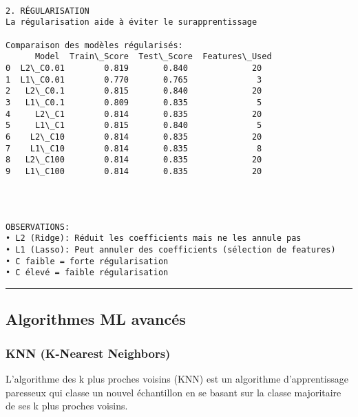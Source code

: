 \documentclass[11pt]{article}
\begin{document}
    \begin{Verbatim}[commandchars=\\\{\}]

2. RÉGULARISATION
La régularisation aide à éviter le surapprentissage

Comparaison des modèles régularisés:
      Model  Train\_Score  Test\_Score  Features\_Used
0  L2\_C0.01        0.819       0.840             20
1  L1\_C0.01        0.770       0.765              3
2   L2\_C0.1        0.815       0.840             20
3   L1\_C0.1        0.809       0.835              5
4     L2\_C1        0.814       0.835             20
5     L1\_C1        0.815       0.840              5
6    L2\_C10        0.814       0.835             20
7    L1\_C10        0.814       0.835              8
8   L2\_C100        0.814       0.835             20
9   L1\_C100        0.814       0.835             20
    \end{Verbatim}

    \begin{center}
    \end{center}
    { \hspace*{\fill} \\}
    
    \begin{Verbatim}[commandchars=\\\{\}]

OBSERVATIONS:
• L2 (Ridge): Réduit les coefficients mais ne les annule pas
• L1 (Lasso): Peut annuler des coefficients (sélection de features)
• C faible = forte régularisation
• C élevé = faible régularisation
    \end{Verbatim}

    \begin{center}\rule{0.5\linewidth}{0.5pt}\end{center}

\subsection{Algorithmes ML avancés}\label{algorithmes-ml-avancuxe9s}

\subsubsection{KNN (K-Nearest Neighbors)}\label{knn-k-nearest-neighbors}

L'algorithme des k plus proches voisins (KNN) est un algorithme
d'apprentissage paresseux qui classe un nouvel échantillon en se basant
sur la classe majoritaire de ses k plus proches voisins.
\end{document}
